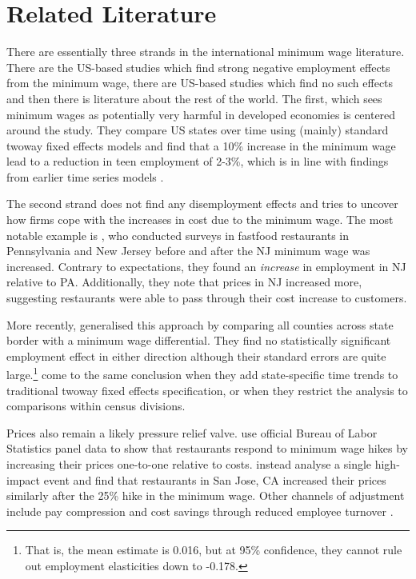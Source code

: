 \section{Related Literature} \label{chap:literature}
There are essentially three strands in the international minimum wage literature. There are the US-based studies which find strong negative employment effects from the minimum wage, there are US-based studies which find no such effects and then there is literature about the rest of the world. The first, which sees minimum wages as potentially very harmful in developed economies is centered around the \citet{Neumark1992} study. They compare US states over time using (mainly) standard twoway fixed effects models and find that a 10\% increase in the minimum wage lead to a reduction in teen employment of 2-3\%, which is in line with findings from earlier time series models \citep{Brown82}. 

The second strand does not find any disemployment effects and tries to uncover how firms cope with the increases in cost due to the minimum wage. The most notable example is \citet{Card1994}, who conducted surveys in fastfood restaurants in Pennsylvania and New Jersey before and after the NJ minimum wage was increased. Contrary to expectations, they found an \emph{increase} in employment in NJ relative to PA. Additionally, they note that prices in NJ increased more, suggesting restaurants were able to pass through their cost increase to customers.

More recently, \citet{Dube2010} generalised this approach by comparing all counties across state border with a minimum wage differential. They find no statistically significant employment effect in either direction although their standard errors are quite large.\footnote{That is, the mean estimate is 0.016, but at 95\% confidence, they cannot rule out employment elasticities down to -0.178.} \citet{Allegretto2011} come to the same conclusion when they add state-specific time trends to traditional twoway fixed effects specification, or when they restrict the analysis to comparisons within census divisions. 

Prices also remain a likely pressure relief valve. \citet{Aaronson2001} use official Bureau of Labor Statistics panel data to show that restaurants respond to minimum wage hikes by increasing their prices one-to-one relative to costs. \citet{Allegretto2018} instead analyse a single high-impact event and find that restaurants in San Jose, CA increased their prices similarly after the 25\% hike in the minimum wage. Other channels of adjustment include pay compression \citep{Hirsch2015} and cost savings through reduced employee turnover \citep{Dube2016a}. 

